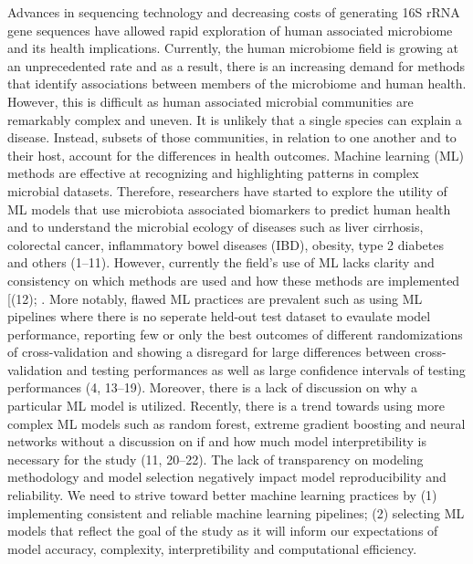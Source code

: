 \documentclass[11pt,]{article}
\begin{document}
Advances in sequencing technology and decreasing costs of generating 16S
rRNA gene sequences have allowed rapid exploration of human associated
microbiome and its health implications. Currently, the human microbiome
field is growing at an unprecedented rate and as a result, there is an
increasing demand for methods that identify associations between members
of the microbiome and human health. However, this is difficult as human
associated microbial communities are remarkably complex and uneven. It
is unlikely that a single species can explain a disease. Instead,
subsets of those communities, in relation to one another and to their
host, account for the differences in health outcomes. Machine learning
(ML) methods are effective at recognizing and highlighting patterns in
complex microbial datasets. Therefore, researchers have started to
explore the utility of ML models that use microbiota associated
biomarkers to predict human health and to understand the microbial
ecology of diseases such as liver cirrhosis, colorectal cancer,
inflammatory bowel diseases (IBD), obesity, type 2 diabetes and others
(1--11). However, currently the field's use of ML lacks clarity and
consistency on which methods are used and how these methods are
implemented {[}(12); . More notably, flawed ML practices are prevalent
such as using ML pipelines where there is no seperate held-out test
dataset to evaulate model performance, reporting few or only the best
outcomes of different randomizations of cross-validation and showing a
disregard for large differences between cross-validation and testing
performances as well as large confidence intervals of testing
performances (4, 13--19). Moreover, there is a lack of discussion on why
a particular ML model is utilized. Recently, there is a trend towards
using more complex ML models such as random forest, extreme gradient
boosting and neural networks without a discussion on if and how much
model interpretibility is necessary for the study (11, 20--22). The lack
of transparency on modeling methodology and model selection negatively
impact model reproducibility and reliability. We need to strive toward
better machine learning practices by (1) implementing consistent and
reliable machine learning pipelines; (2) selecting ML models that
reflect the goal of the study as it will inform our expectations of
model accuracy, complexity, interpretibility and computational
efficiency.
\end{document}
